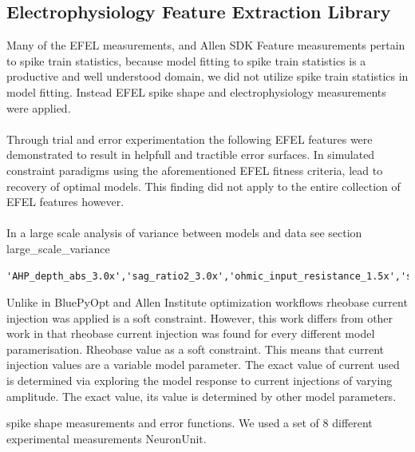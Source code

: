 \subsection{Electrophysiology Feature Extraction Library}

Many of the EFEL measurements, and Allen SDK Feature measurements pertain to spike train statistics, because model fitting to spike train statistics is a productive and well understood domain, we did not utilize spike train statistics in model fitting. Instead EFEL spike shape and electrophysiology measurements were applied.\\
\\
Through trial and error experimentation the following EFEL features were demonstrated to result in helpfull and tractible error surfaces. In simulated constraint paradigms using the aforementioned EFEL fitness criteria, lead to recovery of optimal models. This finding did not apply to the entire collection of EFEL features however.\\
\\
In a large scale analysis of variance between models and data see section large\_scale\_variance


\begin{verbatim}
'AHP_depth_abs_3.0x','sag_ratio2_3.0x','ohmic_input_resistance_1.5x','sag_ratio2_1.5x','peak_voltage_3.0x','peak_voltage_1.5x','voltage_base_3.0x','voltage_base_1.5x','Spikecount_1.5x','Spikecount_3.0x','ohmic_input_resistance_vb_ssse_1.5x'
\end{verbatim}


Unlike in BluePyOpt \cite{Werner} and Allen Institute optimization workflows \cite{gouwens} rheobase current injection was applied is a soft constraint. However, this work differs from other work in that rheobase current injection was found for every different model paramerisation.
Rheobase value as a soft constraint. This means that current injection values are a variable model parameter. The exact value of current used is determined via exploring the model response to current injections of varying amplitude. The exact value, its value is determined by other model parameters.

spike shape measurements and error functions. We used a set of 8 different experimental measurements NeuronUnit.


